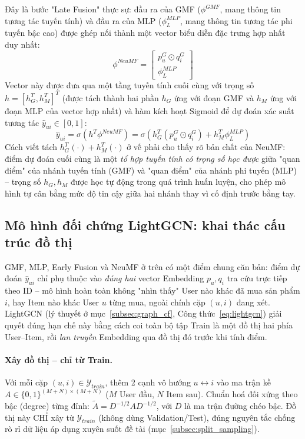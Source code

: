 Đây là bước "Late Fusion" thực sự: đầu ra của GMF ($\phi^{GMF}$, mang thông tin tương tác tuyến tính) và đầu ra của MLP ($\phi_L^{MLP}$, mang thông tin tương tác phi tuyến bậc cao) được ghép nối thành một vector biểu diễn đặc trưng hợp nhất duy nhất:
\begin{equation}
    \phi^{NeuMF} = \begin{bmatrix} p_u^G \odot q_i^G \\ \phi_L^{MLP} \end{bmatrix}
\end{equation}
Vector này được đưa qua một tầng tuyến tính cuối cùng với trọng số $h = [h_G^T, h_M^T]^T$ (được tách thành hai phần $h_G$ ứng với đoạn GMF và $h_M$ ứng với đoạn MLP của vector hợp nhất) và hàm kích hoạt Sigmoid để dự đoán xác suất tương tác $\hat{y}_{ui} \in [0, 1]$:
\begin{equation}
    \hat{y}_{ui} = \sigma \left( h^T \phi^{NeuMF} \right) = \sigma \left( h_G^T (p_u^G \odot q_i^G) + h_M^T \phi_L^{MLP} \right)
\end{equation}
Cách viết tách $h_G^T(\cdot) + h_M^T(\cdot)$ ở vế phải cho thấy rõ bản chất của NeuMF: điểm dự đoán cuối cùng là một \emph{tổ hợp tuyến tính có trọng số học được} giữa "quan điểm" của nhánh tuyến tính (GMF) và "quan điểm" của nhánh phi tuyến (MLP) -- trọng số $h_G, h_M$ được học tự động trong quá trình huấn luyện, cho phép mô hình tự cân bằng mức độ tin cậy giữa hai nhánh thay vì cố định trước bằng tay.

\subsection{Mô hình đối chứng LightGCN: khai thác cấu trúc đồ thị}
\label{subsec:lightgcn_design}

GMF, MLP, Early Fusion và NeuMF ở trên có một điểm chung căn bản: điểm dự đoán $\hat{y}_{ui}$ chỉ phụ thuộc vào \emph{đúng hai} vector Embedding $p_u, q_i$ tra cứu trực tiếp theo ID -- mô hình hoàn toàn không "nhìn thấy" User nào khác đã mua sản phẩm $i$, hay Item nào khác User $u$ từng mua, ngoài chính cặp $(u,i)$ đang xét. LightGCN \parencite{he2020lightgcn} (lý thuyết ở mục~\ref{subsec:graph_cf}, Công thức~\eqref{eq:lightgcn}) giải quyết đúng hạn chế này bằng cách coi toàn bộ tập Train là một đồ thị hai phía User--Item, rồi \emph{lan truyền} Embedding qua đồ thị đó trước khi tính điểm.

\paragraph{Xây đồ thị -- chỉ từ Train.} Với mỗi cặp $(u,i) \in \mathcal{Y}_{train}$, thêm 2 cạnh vô hướng $u \leftrightarrow i$ vào ma trận kề $A \in \{0,1\}^{(M+N)\times(M+N)}$ ($M$ User đầu, $N$ Item sau). Chuẩn hoá đối xứng theo bậc (degree) từng đỉnh: $\tilde{A} = D^{-1/2} A D^{-1/2}$, với $D$ là ma trận đường chéo bậc. Đồ thị này CHỈ xây từ $\mathcal{Y}_{train}$ (không dùng Validation/Test), đúng nguyên tắc chống rò rỉ dữ liệu áp dụng xuyên suốt đề tài (mục~\ref{subsec:split_sampling}).

